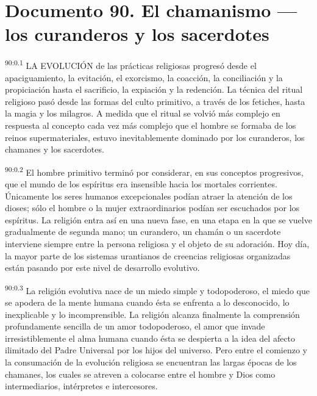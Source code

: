 \chapter{Documento 90. El chamanismo ---los curanderos y los sacerdotes}
\par
\textsuperscript{90:0.1} LA EVOLUCIÓN de las prácticas religiosas progresó desde el apaciguamiento, la evitación, el exorcismo, la coacción, la conciliación y la propiciación hasta el sacrificio, la expiación y la redención. La técnica del ritual religioso pasó desde las formas del culto primitivo, a través de los fetiches, hasta la magia y los milagros. A medida que el ritual se volvió más complejo en respuesta al concepto cada vez más complejo que el hombre se formaba de los reinos supermateriales, estuvo inevitablemente dominado por los curanderos, los chamanes y los sacerdotes.

\par
\textsuperscript{90:0.2} El hombre primitivo terminó por considerar, en sus conceptos progresivos, que el mundo de los espíritus era insensible hacia los mortales corrientes. Únicamente los seres humanos excepcionales podían atraer la atención de los dioses; sólo el hombre o la mujer extraordinarios podían ser escuchados por los espíritus. La religión entra así en una nueva fase, en una etapa en la que se vuelve gradualmente de segunda mano; un curandero, un chamán o un sacerdote interviene siempre entre la persona religiosa y el objeto de su adoración. Hoy día, la mayor parte de los sistemas urantianos de creencias religiosas organizadas están pasando por este nivel de desarrollo evolutivo.

\par
\textsuperscript{90:0.3} La religión evolutiva nace de un miedo simple y todopoderoso, el miedo que se apodera de la mente humana cuando ésta se enfrenta a lo desconocido, lo inexplicable y lo incomprensible. La religión alcanza finalmente la comprensión profundamente sencilla de un amor todopoderoso, el amor que invade irresistiblemente el alma humana cuando ésta se despierta a la idea del afecto ilimitado del Padre Universal por los hijos del universo. Pero entre el comienzo y la consumación de la evolución religiosa se encuentran las largas épocas de los chamanes, los cuales se atreven a colocarse entre el hombre y Dios como intermediarios, intérpretes e intercesores.

